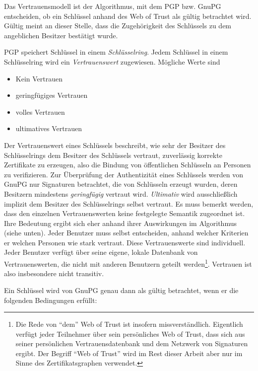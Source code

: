 Das Vertrauensmodell ist der Algorithmus, mit dem PGP bzw. GnuPG
entscheiden, ob ein Schlüssel anhand des Web of Trust als gültig
betrachtet wird\cite{Ashley1999}. Gültig meint an dieser Stelle,
dass die Zugehörigkeit des Schlüssels zu dem angeblichen Besitzer
bestätigt wurde.

PGP speichert Schlüssel in einem \emph{Schlüsselring}. Jedem
Schlüssel in einem Schlüsselring wird ein \emph{Vertrauenswert}
zugewiesen. Mögliche Werte sind
\begin{itemize}
\item Kein Vertrauen
\item geringfügiges Vertrauen
\item volles Vertrauen
\item ultimatives Vertrauen
\end{itemize}
Der Vertrauenswert eines Schlüssels beschreibt, wie sehr der
Besitzer des Schlüsselrings dem Besitzer des Schlüssels vertraut,
zuverlässig korrekte Zertifikate zu erzeugen, also die Bindung von
öffentlichen Schlüsseln an Personen zu verifizieren.  Zur
Überprüfung der Authentizität eines Schlüssels werden von
GnuPG nur Signaturen betrachtet, die von Schlüsseln erzeugt wurden,
deren Besitzern mindestens \emph{geringfügig} vertraut
wird. \emph{Ultimativ} wird ausschließlich implizit dem Besitzer des
Schlüsselrings selbst vertraut. Es muss bemerkt werden, dass den
einzelnen Vertrauenswerten keine festgelegte Semantik zugeordnet
ist. Ihre Bedeutung ergibt sich eher anhand ihrer Auswirkungen im
Algorithmus (siehe unten). Jeder Benutzer muss selbst entscheiden,
anhand welcher Kriterien er welchen Personen wie stark vertraut. Diese
Vertrauenswerte sind individuell. Jeder Benutzer verfügt über
seine eigene, lokale Datenbank von Vertrauenswerten, die nicht mit
anderen Benutzern geteilt werden\footnote{Die Rede von ``dem'' Web of
  Trust ist insofern missverständlich. Eigentlich verfügt jeder
  Teilnehmer über sein persönliches Web of Trust, dass sich aus
  seiner persönlichen Vertrauensdatenbank und dem Netzwerk von
  Signaturen ergibt. Der Begriff ``Web of Trust'' wird im Rest dieser
  Arbeit aber nur im Sinne des Zertifikatsgraphen
  verwendet.}. Vertrauen ist also insbesondere nicht transitiv.

Ein Schlüssel wird von GnuPG genau dann als gültig betrachtet, wenn er
die folgenden Bedingungen erfüllt:

